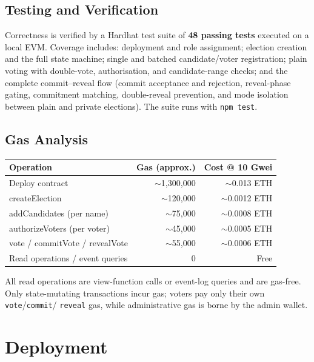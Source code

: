 \documentclass[11pt]{article}
\begin{document}
\subsection{Testing and Verification}
Correctness is verified by a Hardhat test suite of \textbf{48 passing tests} executed on a
local EVM. Coverage includes: deployment and role assignment; election creation and the full
state machine; single and batched candidate/voter registration; plain voting with
double-vote, authorisation, and candidate-range checks; and the complete commit--reveal flow
(commit acceptance and rejection, reveal-phase gating, commitment matching, double-reveal
prevention, and mode isolation between plain and private elections). The suite runs with
\texttt{npm test}.

\subsection{Gas Analysis}
\begin{center}
\begin{tabular}{@{}lrr@{}}
\toprule
\textbf{Operation} & \textbf{Gas (approx.)} & \textbf{Cost @ 10 Gwei} \\
\midrule
Deploy contract & $\sim$1{,}300{,}000 & $\sim$0.013 ETH \\
createElection & $\sim$120{,}000 & $\sim$0.0012 ETH \\
addCandidates (per name) & $\sim$75{,}000 & $\sim$0.0008 ETH \\
authorizeVoters (per voter) & $\sim$45{,}000 & $\sim$0.0005 ETH \\
vote / commitVote / revealVote & $\sim$55{,}000 & $\sim$0.0006 ETH \\
Read operations / event queries & 0 & Free \\
\bottomrule
\end{tabular}
\end{center}
All read operations are view-function calls or event-log queries and are gas-free. Only
state-mutating transactions incur gas; voters pay only their own \texttt{vote}/\texttt{commit}/
\texttt{reveal} gas, while administrative gas is borne by the admin wallet.

\section{Deployment}
\end{document}
